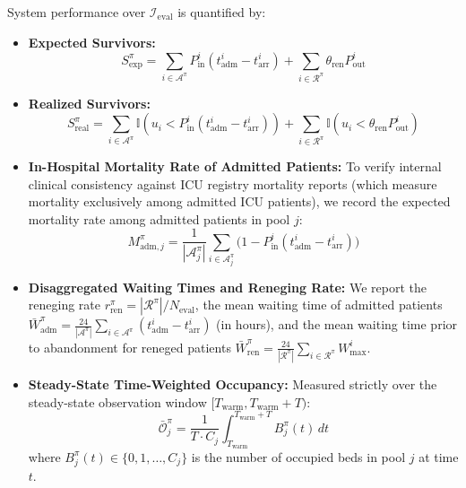 \documentclass[final,5p,times,twocolumn]{elsarticle}
\begin{document}
System performance over $\mathcal{I}_{\text{eval}}$ is quantified by:
\begin{itemize}
    \item \textbf{Expected Survivors:}
    \begin{equation}
        S_{\text{exp}}^{\pi} = \sum_{i \in \mathcal{A}^{\pi}} P_{\text{in}}^i\!\left(t_{\text{adm}}^i - t_{\text{arr}}^i\right) + \sum_{i \in \mathcal{R}^{\pi}} \theta_{\text{ren}} P_{\text{out}}^i
        \label{eq:expected_survivors}
    \end{equation}
    \item \textbf{Realized Survivors:}
    \begin{equation}
        S_{\text{real}}^{\pi} = \sum_{i \in \mathcal{A}^{\pi}} \mathbb{I}\!\left(u_i < P_{\text{in}}^i(t_{\text{adm}}^i - t_{\text{arr}}^i)\right) + \sum_{i \in \mathcal{R}^{\pi}} \mathbb{I}\!\left(u_i < \theta_{\text{ren}} P_{\text{out}}^i\right)
        \label{eq:realized_survivors}
    \end{equation}
    \item \textbf{In-Hospital Mortality Rate of Admitted Patients:} To verify internal clinical consistency against ICU registry mortality reports (which measure mortality exclusively among admitted ICU patients), we record the expected mortality rate among admitted patients in pool $j$:
    \begin{equation}
        M_{\text{adm}, j}^{\pi} = \frac{1}{|\mathcal{A}_j^{\pi}|} \sum_{i \in \mathcal{A}_j^{\pi}} \Big( 1 - P_{\text{in}}^i(t_{\text{adm}}^i - t_{\text{arr}}^i) \Big)
        \label{eq:admitted_mortality}
    \end{equation}
    \item \textbf{Disaggregated Waiting Times and Reneging Rate:} We report the reneging rate $r_{\text{ren}}^{\pi} = |\mathcal{R}^{\pi}| / N_{\text{eval}}$, the mean waiting time of admitted patients $\bar{W}_{\text{adm}}^{\pi} = \frac{24}{|\mathcal{A}^{\pi}|}\sum_{i \in \mathcal{A}^{\pi}} (t_{\text{adm}}^i - t_{\text{arr}}^i)$ (in hours), and the mean waiting time prior to abandonment for reneged patients $\bar{W}_{\text{ren}}^{\pi} = \frac{24}{|\mathcal{R}^{\pi}|}\sum_{i \in \mathcal{R}^{\pi}} W_{\max}^i$.
    \item \textbf{Steady-State Time-Weighted Occupancy:} Measured strictly over the steady-state observation window $[T_{\text{warm}}, T_{\text{warm}} + T)$:
    \begin{equation}
        \bar{\mathcal{O}}_j^{\pi} = \frac{1}{T \cdot C_j} \int_{T_{\text{warm}}}^{T_{\text{warm}} + T} B_j^{\pi}(t) \, dt
        \label{eq:occupancy}
    \end{equation}
    where $B_j^{\pi}(t) \in \{0, 1, \dots, C_j\}$ is the number of occupied beds in pool $j$ at time $t$.
\end{itemize}
\end{document}

